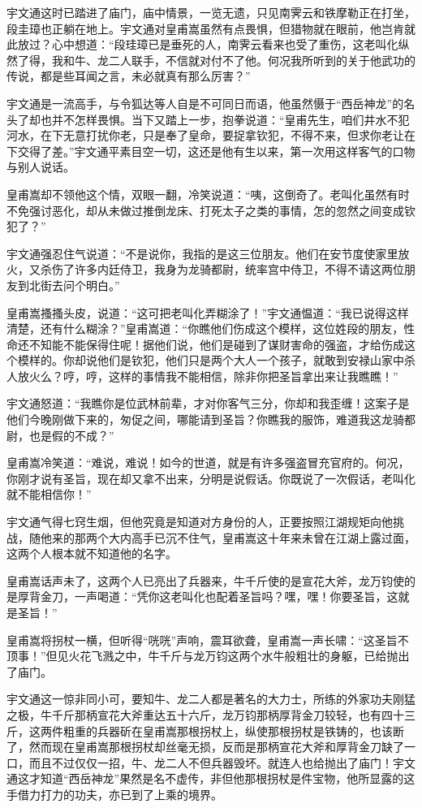 \documentclass[12pt,oneside]{book}
\begin{document}
宇文通这时已踏进了庙门，庙中情景，一览无遗，只见南霁云和铁摩勒正在打坐，段圭璋也正躺在地上。宇文通对皇甫嵩虽然有点畏惧，但猎物就在眼前，他岂肯就此放过？心中想道：``段珪璋已是垂死的人，南霁云看来也受了重伤，这老叫化纵然了得，我和牛、龙二人联手，不信就对付不了他。何况我所听到的关于他武功的传说，都是些耳闻之言，未必就真有那么厉害？''

宇文通是一流高手，与令狐达等人自是不可同日而语，他虽然慑于``西岳神龙''的名头了却也并不怎样畏惧。当下又踏上一步，抱拳说道：``皇甫先生，咱们井水不犯河水，在下无意打扰你老，只是奉了皇命，要捉拿钦犯，不得不来，但求你老让在下交得了差。''宇文通平素目空一切，这还是他有生以来，第一次用这样客气的口物与别人说话。

皇甫嵩却不领他这个情，双眼一翻，冷笑说道：``咦，这倒奇了。老叫化虽然有时不免强讨恶化，却从未做过推倒龙床、打死太子之类的事情，怎的忽然之间变成钦犯了？''

宇文通强忍住气说道：``不是说你，我指的是这三位朋友。他们在安节度使家里放火，又杀伤了许多内廷侍卫，我身为龙骑都尉，统率宫中侍卫，不得不请这两位朋友到北街去问个明白。''

皇甫嵩搔搔头皮，说道：``这可把老叫化弄糊涂了！''宇文通愠道：``我已说得这样清楚，还有什么糊涂？''皇甫嵩道：``你瞧他们伤成这个模样，这位姓段的朋友，性命还不知能不能保得住呢！据他们说，他们是碰到了谋财害命的强盗，才给伤成这个模样的。你却说他们是钦犯，他们只是两个大人一个孩子，就敢到安禄山家中杀人放火么？哼，哼，这样的事情我不能相信，除非你把圣旨拿出来让我瞧瞧！''

宇文通怒道：``我瞧你是位武林前辈，才对你客气三分，你却和我歪缠！这案子是他们今晚刚做下来的，匆促之间，哪能请到圣旨？你瞧我的服饰，难道我这龙骑都尉，也是假的不成？''

皇甫嵩冷笑道：``难说，难说！如今的世道，就是有许多强盗冒充官府的。何况，你刚才说有圣旨，现在却又拿不出来，分明是说假话。你既说了一次假话，老叫化就不能相信你！''

宇文通气得七窍生烟，但他究竟是知道对方身份的人，正要按照江湖规矩向他挑战，随他来的那两个大内高手已沉不住气，皇甫嵩这十年来未曾在江湖上露过面，这两个人根本就不知道他的名字。

皇甫嵩话声未了，这两个人已亮出了兵器来，牛千斤使的是宣花大斧，龙万钧使的是厚背金刀，一声喝道：``凭你这老叫化也配着圣旨吗？嘿，嘿！你要圣旨，这就是圣旨！''

皇甫嵩将拐杖一横，但听得``咣咣''声响，震耳欲聋，皇甫嵩一声长啸：``这圣旨不顶事！''但见火花飞溅之中，牛千斤与龙万钧这两个水牛般粗壮的身躯，已给抛出了庙门。

宇文通这一惊非同小可，要知牛、龙二人都是著名的大力士，所练的外家功夫刚猛之极，牛千斤那柄宣花大斧重达五十六斤，龙万钧那柄厚背金刀较轻，也有四十三斤，这两件粗重的兵器斫在皇甫嵩那根拐杖上，纵使那根拐杖是铁铸的，也该断了，然而现在皇甫嵩那根拐杖却丝毫无损，反而是那柄宣花大斧和厚背金刀缺了一口，而且不过仅仅一招，牛、龙二人不但兵器毁坏。就连人也给抛出了庙门！宇文通这才知道``西岳神龙''果然是名不虚传，非但他那根拐杖是件宝物，他所显露的这手借力打力的功夫，亦已到了上乘的境界。
\end{document}
